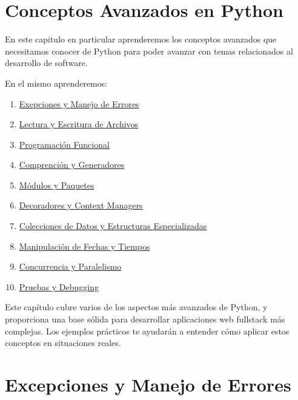 \documentclass[
  a4paper,
  DIV=11,
  numbers=noendperiod,
  onepage,
  openany]{scrreprt}
\begin{document}
\chapter{Conceptos Avanzados en
Python}\label{conceptos-avanzados-en-python}

En este capitulo en particular aprenderemos los conceptos avanzados que
necesitamos conocer de Python para poder avanzar con temas relacionados
al desarrollo de software.

En el mismo aprenderemos:

\begin{enumerate}
\def\labelenumi{\arabic{enumi}.}
\item
  \href{./1_exepciones_manejo_de_errores.qmd}{Exepciones y Manejo de
  Errores}
\item
  \href{./2_lectura_y_escritura_de_archivos.qmd}{Lectura y Escritura de
  Archivos}
\item
  \href{./3_programacion_funcional.qmd}{Programación Funcional}
\item
  \href{./4_comprension_y_generadores.qmd}{Comprención y Generadores}
\item
  \href{./5_modulos_y_paquetes_avanzados.qmd}{Módulos y Paquetes}
\item
  \href{./6_decoradores_y_context_managers.qmd}{Decoradores y Context
  Managers}
\item
  \href{./7_colecciones_de_datos_y_estructuras_especializadas.qmd}{Colecciones
  de Datos y Estructuras Especializadas}
\item
  \href{./8_manipulacion_de_fechas_y_tiempos.qmd}{Manipulación de Fechas
  y Tiempos}
\item
  \href{./9_concurrencia_y_paralelismo.qmd}{Concurrencia y Paralelismo}
\item
  \href{./10_pruebas_y_debugging.qmd}{Pruebas y Debugging}
\end{enumerate}

Este capítulo cubre varios de los aspectos más avanzados de Python, y
proporciona una base sólida para desarrollar aplicaciones web fullstack
más complejas. Los ejemplos prácticos te ayudarán a entender cómo
aplicar estos conceptos en situaciones reales.

\chapter{Excepciones y Manejo de
Errores}\label{excepciones-y-manejo-de-errores}
\end{document}
